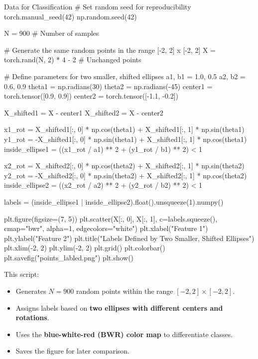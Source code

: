 \begin{codeonly}{Data for Classification}
# Set random seed for reproducibility
torch.manual_seed(42)
np.random.seed(42)

N = 900  # Number of samples

# Generate the same random points in the range [-2, 2] x [-2, 2]
X = torch.rand(N, 2) * 4 - 2  # Unchanged points

# Define parameters for two smaller, shifted ellipses
a1, b1 = 1.0, 0.5
a2, b2 = 0.6, 0.9
theta1 = np.radians(30)
theta2 = np.radians(-45)
center1 = torch.tensor([0.9, 0.9])
center2 = torch.tensor([-1.1, -0.2])

X_shifted1 = X - center1
X_shifted2 = X - center2

x1_rot = X_shifted1[:, 0] * np.cos(theta1) + X_shifted1[:, 1] * np.sin(theta1)
y1_rot = -X_shifted1[:, 0] * np.sin(theta1) + X_shifted1[:, 1] * np.cos(theta1)
inside_ellipse1 = ((x1_rot / a1) ** 2 + (y1_rot / b1) ** 2) < 1

x2_rot = X_shifted2[:, 0] * np.cos(theta2) + X_shifted2[:, 1] * np.sin(theta2)
y2_rot = -X_shifted2[:, 0] * np.sin(theta2) + X_shifted2[:, 1] * np.cos(theta2)
inside_ellipse2 = ((x2_rot / a2) ** 2 + (y2_rot / b2) ** 2) < 1

labels = (inside_ellipse1 | inside_ellipse2).float().unsqueeze(1).numpy()

plt.figure(figsize=(7, 5))
plt.scatter(X[:, 0], X[:, 1], c=labels.squeeze(), cmap="bwr", alpha=1, edgecolors="white")
plt.xlabel("Feature 1")
plt.ylabel("Feature 2")
plt.title("Labels Defined by Two Smaller, Shifted Ellipses")
plt.xlim(-2, 2)
plt.ylim(-2, 2)
plt.grid()
plt.colorbar()
plt.savefig("points_labled.png")
plt.show()
\end{codeonly}

This script:
\begin{itemize}
    \item Generates $N=900$ random points within the range $[-2,2] \times [-2,2]$.
    \item Assigns labels based on \textbf{two ellipses with different centers and rotations}.
    \item Uses the \textbf{blue-white-red (BWR) color map} to differentiate classes.
    \item Saves the figure for later comparison.
\end{itemize}

